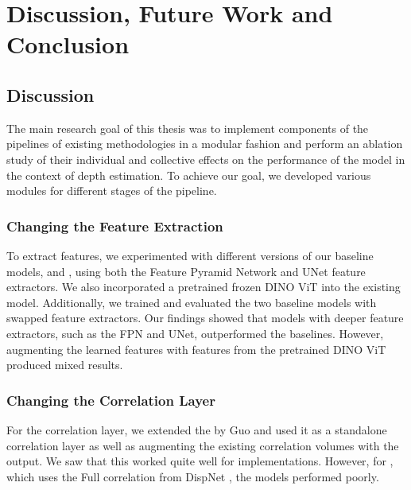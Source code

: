\chapter{Discussion, Future Work and Conclusion}\label{chap:conclusion}

\section{Discussion}
The main research goal of this thesis was to implement components of the pipelines of existing {\mvs} methodologies in a modular fashion and perform an ablation study of their individual and collective effects on the performance of the model in the context of depth estimation. To achieve our goal, we developed various modules for different stages of the {\mvs} pipeline.\par

\subsection*{Changing the Feature Extraction}
 To extract features, we experimented with different versions of our baseline models, {\mvsn} and {\rmvd}, using both the Feature Pyramid Network and UNet feature extractors. We also incorporated a pretrained frozen DINO ViT into the existing {\mvsn} model. Additionally, we trained and evaluated the two baseline models with swapped feature extractors. Our findings showed that models with deeper feature extractors, such as the FPN and UNet, outperformed the baselines. However, augmenting the learned features with features from the pretrained DINO ViT produced mixed results. \par

\subsection*{Changing the Correlation Layer}
For the correlation layer, we extended the {\gwc} by Guo \etal \cite{guo2019group} and used it as a standalone correlation layer as well as augmenting the existing correlation volumes with the {\gwc} output. We saw that this worked quite well for {\mvsn} implementations. However, for {\rmvd}, which uses the Full correlation from DispNet \cite{Mayer2016}, the models performed poorly. \par

